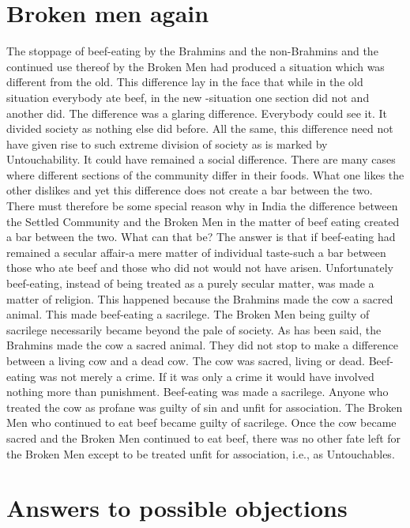 \documentclass{article}
\begin{document}
\section{Broken men again}
\begin{shadequote}
The stoppage of beef-eating by the Brahmins and the non-Brahmins and the continued use thereof by the Broken Men had produced a situation which was different from the old. This difference lay in the face that while in the old situation everybody ate beef, in the new -situation one section did not and another did. The difference was a glaring difference. Everybody could see it. It divided society as nothing else did before. All the same, this difference need not have given rise to such extreme division of society as is marked by Untouchability. It could have remained a social difference. There are many cases where different sections of the community differ in their foods. What one likes the other dislikes and yet this difference does not create a bar between the two.
There must therefore be some special reason why in India the difference between the Settled Community and the Broken Men in the matter of beef eating created a bar between the two. What can that be? The answer is that if beef-eating had remained a secular affair-a mere matter of individual taste-such a bar between those who ate beef and those who did not would not have arisen. Unfortunately beef-eating, instead of being treated as a purely secular        matter, was made a matter of religion. This happened because the Brahmins made the cow a sacred animal. This made beef-eating a sacrilege. The Broken Men being guilty of sacrilege necessarily became beyond the pale of society.
As has been said, the Brahmins made the cow a sacred animal. They did not stop to make a difference between a living cow and a dead cow. The cow was sacred, living or dead. Beef-eating was not merely a crime. If it was only a crime it would have involved nothing more than punishment. Beef-eating was made a sacrilege. Anyone who treated the cow as profane was guilty of sin and unfit for association. The Broken Men who continued to eat beef became guilty of sacrilege.
Once the cow became sacred and the Broken Men continued to eat beef, there was no other fate left for the Broken Men except to be treated unfit for association, i.e., as Untouchables.
\end{shadequote}

\section{Answers to possible objections}
\end{document}
